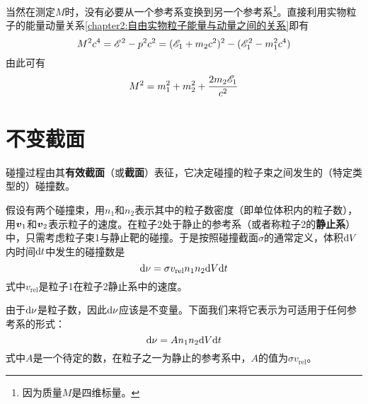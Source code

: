 当然在测定$M$时，没有必要从一个参考系变换到另一个参考系\footnote{因为质量$M$是四维标量。}。直接利用实物粒子的能量动量关系\eqref{chapter2:自由实物粒子能量与动量之间的关系}即有
\begin{equation*}
	M^2c^4 = \mathscr{E}^2-p^2c^2 = (\mathscr{E}_1+m_2c^2)^2-(\mathscr{E}_1^2-m_1^2c^4)
\end{equation*}
由此可有
\begin{equation}
	M^2 = m_1^2+m_2^2+\frac{2m_2\mathscr{E}_1}{c^2}
\end{equation}

\iffalse
\begin{example}
一个以速度$V$运动的粒子在“飞行”中分解为两个粒子。求这些粒子的出射角同其能量之间的关系。
\end{example}
\begin{solution}
记$\E_0$为衰变粒子之一在C系中的能量，$\E$是这一粒子在L系中的能量
\end{solution}
\fi

\section{不变截面}

碰撞过程由其{\bf 有效截面}（或{\bf 截面}）表征，它决定碰撞的粒子束之间发生的（特定类型的）碰撞数。

假设有两个碰撞束，用$n_1$和$n_2$表示其中的粒子数密度（即单位体积内的粒子数），用$\boldsymbol{v}_1$和$\boldsymbol{v}_2$表示粒子的速度。在粒子2处于静止的参考系（或者称粒子2的{\bf 静止系}）中，只需考虑粒子束1与静止靶的碰撞。于是按照碰撞截面$\sigma$的通常定义，体积$\mathrm{d} V$内时间$\mathrm{d} t$中发生的碰撞数是
\begin{equation}
	\mathrm{d} \nu = \sigma v_{\text{rel}}n_1n_2 \mathrm{d} V \mathrm{d} t
	\label{chapter2:不变截面1}
\end{equation}
式中$v_{\text{rel}}$是粒子1在粒子2静止系中的速度。

由于$\mathrm{d} \nu$是粒子数，因此$\mathrm{d} \nu$应该是不变量。下面我们来将它表示为可适用于任何参考系的形式：
\begin{equation}
	\mathrm{d} \nu = An_1n_2\mathrm{d} V\mathrm{d} t
	\label{chapter2:不变截面2}
\end{equation}
式中$A$是一个待定的数，在粒子之一为静止的参考系中，$A$的值为$\sigma v_{\text{rel}}$。

